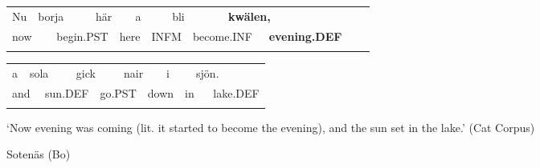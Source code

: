 \begin{tabular}{llllllllllllll}
\lsptoprule
Nu & \multicolumn{2}{l}{borja

} & \multicolumn{2}{l}{här

} & \multicolumn{2}{l}{a

} & \multicolumn{2}{l}{bli

} & \multicolumn{2}{l}{{\bfseries kwälen,}

} & \multicolumn{2}{l}{} & \\
\multicolumn{2}{l}{now

} & \multicolumn{2}{l}{begin.PST

} & \multicolumn{2}{l}{here

} & \multicolumn{2}{l}{INFM

} & \multicolumn{2}{l}{become.INF

} & \multicolumn{2}{l}{{\bfseries evening.DEF}

} & \multicolumn{2}{l}{}\\
\lspbottomrule
\end{tabular}

\begin{tabular}{llllllllllll}
\lsptoprule
a & \multicolumn{2}{l}{sola

} & \multicolumn{2}{l}{gick

} & \multicolumn{2}{l}{nair

} & \multicolumn{2}{l}{i

} & \multicolumn{2}{l}{sjön.

} & \\
\multicolumn{2}{l}{and

} & \multicolumn{2}{l}{sun.DEF

} & \multicolumn{2}{l}{go.PST

} & \multicolumn{2}{l}{down

} & \multicolumn{2}{l}{in

} & \multicolumn{2}{l}{lake.DEF

}\\
\lspbottomrule
\end{tabular}

\begin{styleTranslation}
‘Now evening was coming (lit. it started to become the evening), and the sun set in the lake.’ (Cat Corpus)

\end{styleTranslation}

\begin{listWWNumileveli}
\item 

\begin{styleExample}
Sotenäs (Bo)

\end{styleExample}

\end{listWWNumileveli}

